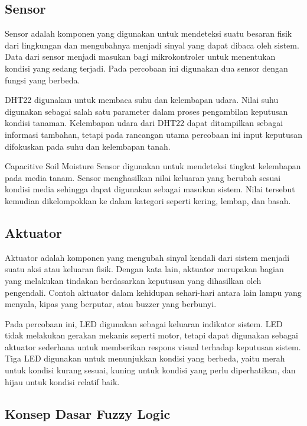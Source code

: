 \documentclass[12pt,a4paper]{article}
\begin{document}
\subsection{Sensor}

Sensor adalah komponen yang digunakan untuk mendeteksi suatu besaran fisik dari lingkungan dan mengubahnya menjadi sinyal yang dapat dibaca oleh sistem. Data dari sensor menjadi masukan bagi mikrokontroler untuk menentukan kondisi yang sedang terjadi. Pada percobaan ini digunakan dua sensor dengan fungsi yang berbeda.

DHT22 digunakan untuk membaca suhu dan kelembapan udara. Nilai suhu digunakan sebagai salah satu parameter dalam proses pengambilan keputusan kondisi tanaman. Kelembapan udara dari DHT22 dapat ditampilkan sebagai informasi tambahan, tetapi pada rancangan utama percobaan ini input keputusan difokuskan pada suhu dan kelembapan tanah.

Capacitive Soil Moisture Sensor digunakan untuk mendeteksi tingkat kelembapan pada media tanam. Sensor menghasilkan nilai keluaran yang berubah sesuai kondisi media sehingga dapat digunakan sebagai masukan sistem. Nilai tersebut kemudian dikelompokkan ke dalam kategori seperti kering, lembap, dan basah.

\subsection{Aktuator}

Aktuator adalah komponen yang mengubah sinyal kendali dari sistem menjadi suatu aksi atau keluaran fisik. Dengan kata lain, aktuator merupakan bagian yang melakukan tindakan berdasarkan keputusan yang dihasilkan oleh pengendali. Contoh aktuator dalam kehidupan sehari-hari antara lain lampu yang menyala, kipas yang berputar, atau buzzer yang berbunyi.

Pada percobaan ini, LED digunakan sebagai keluaran indikator sistem. LED tidak melakukan gerakan mekanis seperti motor, tetapi dapat digunakan sebagai aktuator sederhana untuk memberikan respons visual terhadap keputusan sistem. Tiga LED digunakan untuk menunjukkan kondisi yang berbeda, yaitu merah untuk kondisi kurang sesuai, kuning untuk kondisi yang perlu diperhatikan, dan hijau untuk kondisi relatif baik.

\subsection{Konsep Dasar Fuzzy Logic}
\end{document}
